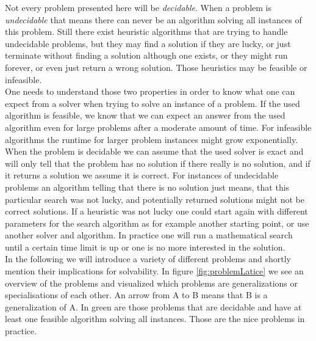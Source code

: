 Not every problem presented here will be \emph{decidable}. When a problem is \emph{undecidable} that means there can never be an algorithm solving all instances of this problem. Still there exist heuristic algorithms that are trying to handle undecidable problems, but they may find a solution if they are lucky, or just terminate without finding a solution although one exists, or they might run forever, or even just return a wrong solution. Those heuristics may be feasible or infeasible.\\
One needs to understand those two properties in order to know what one can expect from a solver when trying to solve an instance of a problem. If the used algorithm is feasible, we know that we can expect an answer from the used algorithm even for large problems after a moderate amount of time. For infeasible algorithms the runtime for larger problem instances might grow exponentially.\\
When the problem is decidable we can assume that the used solver is exact and will only tell that the problem has no solution if there really is no solution, and if it returns a solution we assume it is correct. For instances of undecidable problems an algorithm telling that there is no solution just means, that this particular search was not lucky, and potentially returned solutions might not be correct solutions. If a heuristic was not lucky one could start again with different parameters for the search algorithm as for example another starting point, or use another solver and algorithm. In practice one will run a mathematical search until a certain time limit is up or one is no more interested in the solution.\\
In the following we will introduce a variety of different problems and shortly mention their implications for solvability. In figure \ref{fig:problemLatice} we see an overview of the problems and visualized which problems are generalizations or specialisations of each other. An arrow from A to B means that B is a generalization of A. In green are those problems that are decidable and have at least one feasible algorithm solving all instances. Those are the nice problems in practice.
